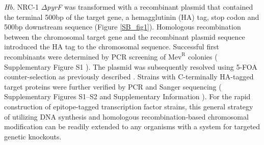 {\em Hb.} NRC-1 $\Delta${\em pyrF} was transformed with a recombinant plasmid that contained the terminal 500bp of the target gene, a hemagglutinin (HA) tag, stop codon and 500bp downstream sequence (Figure \ref{SB_fig1}). Homologous recombination between the chromosomal target gene and the recombinant plasmid sequence introduced the HA tag to the chromosomal sequence. Successful first recombinants were determined by PCR screening of $\mathrm{Mev}^{\mathrm{R}}$ colonies ( Supplementary Figure S1 ). The plasmid was subsequently resolved using 5-FOA counter-selection as previously described \cite{kaur_systems_2006,peck_homologous_2000}. Strains with C-terminally HA-tagged target proteins were further verified by PCR and Sanger sequencing ( Supplementary Figures S1–S2 and Supplementary Information ). For the rapid construction of epitope-tagged transcription factor strains, this general strategy of utilizing DNA synthesis and homologous recombination-based chromosomal modification can be readily extended to any organisms with a system for targeted genetic knockouts.

